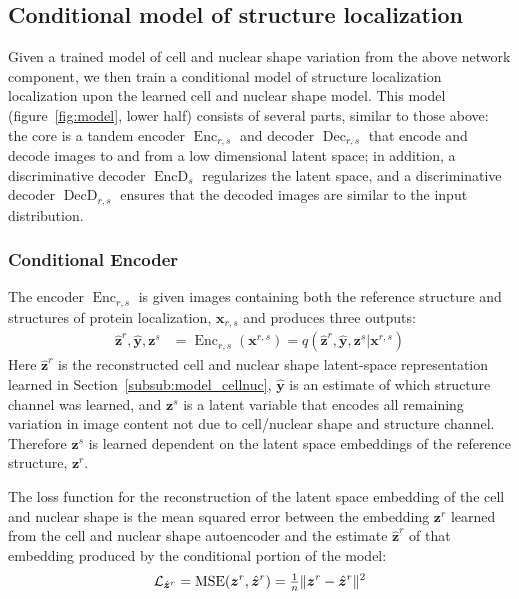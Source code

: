 \documentclass[accepted]{article}
\DeclareMathOperator{\EncD}{EncD}
\DeclareMathOperator{\DecD}{DecD}
\DeclareMathOperator{\Enc}{Enc}
\DeclareMathOperator{\Dec}{Dec}
\DeclareMathOperator{\mse}{MSE}
\DeclarePairedDelimiter\norm{\lVert}{\rVert}
\begin{document}
\subsection{Conditional model of structure localization}

Given a trained model of cell and nuclear shape variation from the above network component, we then train a conditional model of structure localization localization upon the learned cell and nuclear shape model.
This model (figure~\ref{fig:model}, lower half) consists of several parts, similar to those above: the core is a tandem encoder $\Enc_{r,s}$ and decoder $\Dec_{r,s}$ that encode and decode images to and from a low dimensional latent space; in addition, a discriminative decoder $\EncD_{s}$ regularizes the latent space, and a discriminative decoder $\DecD_{r,s}$ ensures that the decoded images are similar to the input distribution.

\subsubsection{Conditional Encoder}

The encoder $\Enc_{r,s}$ is given images containing both the reference structure and structures of protein localization, $\bm{x}_{r,s}$ and produces three outputs:
%
\begin{align} \label{eqn:cond_enc}
    {\hat{\bm{z}}^r, \hat{\bm{y}}, \bm{z}^s} &= \Enc_{r,s}(\bm{x}^{r,s}) = q({\hat{\bm{z}}^r, \hat{\bm{y}}, \bm{z}^s} | \bm{x}^{r,s})
\end{align}
%
Here $\hat{\bm{z}}^r$ is the reconstructed cell and nuclear shape latent-space representation learned in Section~\ref{subsub:model_cellnuc}, $\hat{\bm{y}}$ is an estimate of which structure channel was learned, and $\bm{z}^s$ is a latent variable that encodes all remaining variation in image content not due to cell/nuclear shape and structure channel.
Therefore $\bm{z}^s$ is learned dependent on the latent space embeddings of the reference structure, $\bm{z}^r$.

The loss function for the reconstruction of the latent space embedding of the cell and nuclear shape is the mean squared error between the embedding $\bm{z}^r$ learned from the cell and nuclear shape autoencoder and the estimate $\hat{\bm{z}}^r$ of that embedding produced by the conditional portion of the model:
%
\begin{align}
     \mathcal{L}_{\hat{\bm{z}}^r} = \mse (\bm{z}^r, \hat{\bm{z}}^r) =
                                    \tfrac{1}{n} \norm{ \bm{z}^r - \hat{\bm{z}}^r}^2
\end{align}
\end{document}
